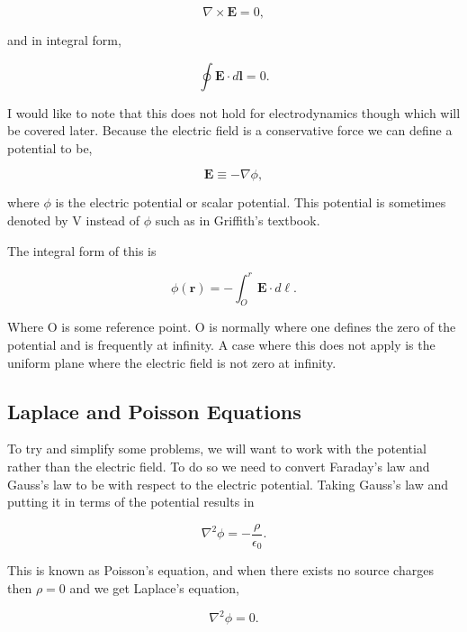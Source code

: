 \documentclass[preprint, review,12pt]{elsarticle}
\def\x{\times}
\def\.{\cdot}
\def\b{\textbf}
\def\bell{\bm{\ell}}
\def\={\equiv}
\def\curl{\nabla \x}
\def\lap{\nabla^2}
\begin{document}
\begin{equation}
    \curl \b{E} = 0,
\end{equation}

and in integral form,

\begin{equation}
    \oint \b{E} \. d\b{l} = 0.
\end{equation}

I would like to note that this does not hold for electrodynamics though which will be covered later. Because the electric field is a conservative force we can define a potential to be,

\begin{equation}
    \b{E} \= -\nabla \phi,
\end{equation}

where $\phi$ is the electric potential or scalar potential. This potential is sometimes denoted by V instead of $\phi$ such as in Griffith's textbook.

The integral form of this is

\begin{equation}
    \phi(\b{r}) = - \int_O^r \b{E}\. d \bell.
\end{equation}

Where O is some reference point. O is normally where one defines the zero of the potential and is frequently at infinity. A case where this does not apply is the uniform plane where the electric field is not zero at infinity. 

\subsection{Laplace and Poisson Equations}

To try and simplify some problems, we will want to work with the potential rather than the electric field. To do so we need to convert Faraday's law and Gauss's law to be with respect to the electric potential. Taking Gauss's law and putting it in terms of the potential results in

\begin{equation}
    \lap \phi = -\frac{\rho}{\epsilon_0}.
\end{equation}

This is known as Poisson's equation, and when there exists no source charges then $\rho = 0$ and we get Laplace's equation,

\begin{equation}
    \lap \phi = 0.
\end{equation}
\end{document}
